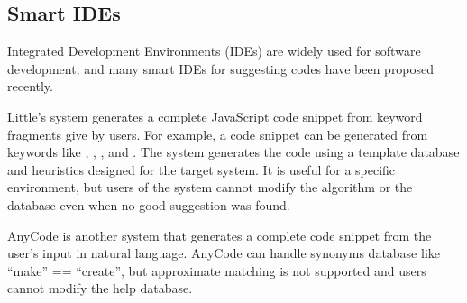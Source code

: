 \documentclass{sigchi}
\begin{document}
\subsection{Smart IDEs}

Integrated Development Environments (IDEs) are widely used for
software development, and
many smart IDEs for suggesting codes have been proposed recently.

Little's system\cite{Little:2006:TKC:1166253.1166275}
generates a complete JavaScript code snippet from keyword fragments
give by users.
For example, a code snippet
can be generated from keywords like
,
,
,
and .
The system generates the code using a template database and heuristics
designed for the target system.
It is useful for a specific environment, but
users of the system cannot modify the algorithm or the database
even when no good suggestion was found.


AnyCode\cite{Gvero:2015:SJE:2814270.2814295} is another system
that generates a complete code snippet from the user's
input in natural language.
AnyCode can handle synonyms database like ``make'' == ``create'',
but approximate matching is not supported and
users cannot modify the help database.


\end{document}
